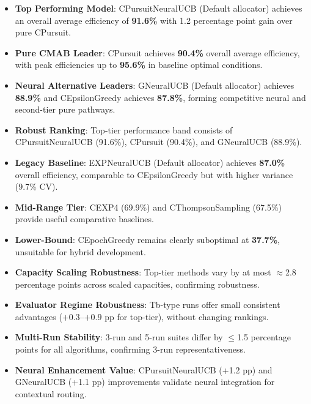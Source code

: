 \documentclass[12pt,a4paper]{article}
\newcommand{\performance}[1]{\textcolor{performancecolor}{\textbf{#1}}}
\newcommand{\critical}[1]{\textcolor{criticalcolor}{\textbf{#1}}}
\newcommand{\success}[1]{\textcolor{successcolor}{\textbf{#1}}}
\newcommand{\legacy}[1]{\textcolor{legacycolor}{\textbf{#1}}}
\newcommand{\neural}[1]{\textcolor{neuralcolor}{\textbf{#1}}}
\begin{document}
\begin{tcolorbox}[colback=highlightcolor!30,colframe=performancecolor,title=\textbf{Key Experimental Results Summary (3-run/5-run, 1$\times$–2$\times$ Capacities, T/Tb Regimes)}]
\begin{itemize}
\item \neural{Top Performing Model}: CPursuitNeuralUCB (Default allocator) achieves an overall average efficiency of \textbf{91.6\%} with 1.2 percentage point gain over pure CPursuit.
\item \performance{Pure CMAB Leader}: CPursuit achieves \textbf{90.4\%} overall average efficiency, with peak efficiencies up to \textbf{95.6\%} in baseline optimal conditions.
\item \neural{Neural Alternative Leaders}: GNeuralUCB (Default allocator) achieves \textbf{88.9\%} and CEpsilonGreedy achieves \textbf{87.8\%}, forming competitive neural and second-tier pure pathways.
\item \performance{Robust Ranking}: Top-tier performance band consists of CPursuitNeuralUCB (91.6\%), CPursuit (90.4\%), and GNeuralUCB (88.9\%).
\item \legacy{Legacy Baseline}: EXPNeuralUCB (Default allocator) achieves \textbf{87.0\%} overall efficiency, comparable to CEpsilonGreedy but with higher variance (9.7\% CV).
\item \performance{Mid-Range Tier}: CEXP4 (69.9\%) and CThompsonSampling (67.5\%) provide useful comparative baselines.
\item \critical{Lower-Bound}: CEpochGreedy remains clearly suboptimal at \textbf{37.7\%}, unsuitable for hybrid development.
\item \success{Capacity Scaling Robustness}: Top-tier methods vary by at most $\approx$2.8 percentage points across scaled capacities, confirming robustness.
\item \success{Evaluator Regime Robustness}: Tb-type runs offer small consistent advantages ($+0.3$--$+0.9$ pp for top-tier), without changing rankings.
\item \success{Multi-Run Stability}: 3-run and 5-run suites differ by $\leq$1.5 percentage points for all algorithms, confirming 3-run representativeness.
\item \neural{Neural Enhancement Value}: CPursuitNeuralUCB (+1.2 pp) and GNeuralUCB (+1.1 pp) improvements validate neural integration for contextual routing.
\end{itemize}
\end{tcolorbox}
\end{document}
